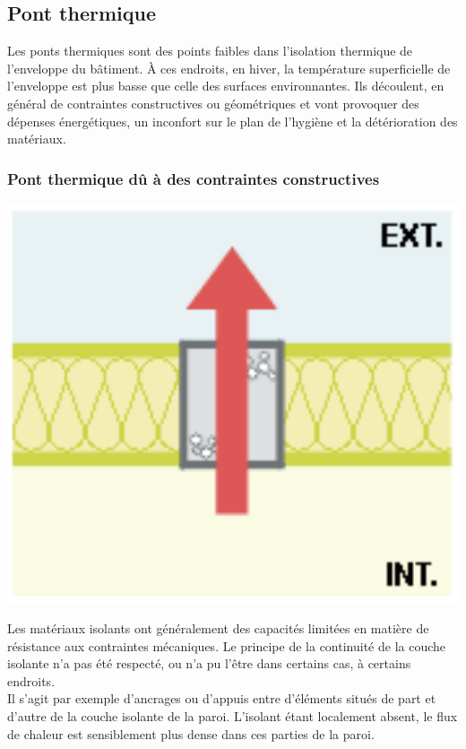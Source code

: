 \documentclass[11pt]{report}
\begin{document}
\subsection{Pont thermique}
Les ponts thermiques sont des points faibles dans l'isolation thermique de l'enveloppe du bâtiment.
À ces endroits, en hiver, la température superficielle de l'enveloppe est plus basse que celle des surfaces environnantes.
Ils découlent, en général de contraintes constructives ou géométriques
et vont provoquer des dépenses énergétiques, un inconfort sur le plan de l'hygiène et la détérioration des matériaux.


\subsubsection{Pont thermique dû à des contraintes constructives}
\begin{minipage}{0.3\linewidth}
\centering
\includegraphics[scale=0.4]{pont1}
\end{minipage}
\begin{minipage}{0.65\linewidth}
Les matériaux isolants ont généralement des capacités limitées en matière de résistance aux contraintes mécaniques. Le principe de la continuité de la couche isolante n'a pas été respecté, ou n'a pu l'être dans certains cas, à certains endroits.\\

 Il s'agit par exemple d'ancrages ou d'appuis entre d'éléments situés de part et d'autre de la couche isolante de la paroi. L'isolant étant localement absent, le flux de chaleur est sensiblement plus dense dans ces parties de la paroi.
\end{minipage}
\end{document}
